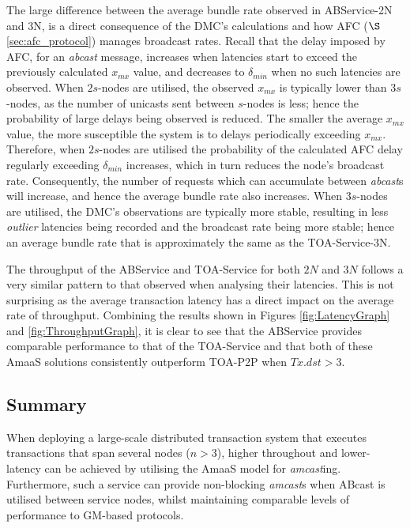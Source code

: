     The large difference between the average bundle rate observed in ABService-2N and 3N, is a direct consequence of the DMC's calculations and how AFC ($\S$ \ref{sec:afc_protocol}) manages broadcast rates.  Recall that the delay imposed by AFC, for an \emph{abcast} message, increases when latencies start to exceed the previously calculated $x_{mx}$ value, and decreases to $\delta_{min}$ when no such latencies are observed.  When $2 s$-nodes are utilised, the observed $x_{mx}$ is typically lower than $3 s$-nodes, as the number of unicasts sent between $s$-nodes is less; hence the probability of large delays being observed is reduced.  The smaller the average $x_{mx}$ value, the more susceptible the system is to delays periodically exceeding $x_{mx}$.  Therefore, when $2 s$-nodes are utilised the probability of the calculated AFC delay regularly exceeding $\delta_{min}$ increases, which in turn reduces the node's broadcast rate.  Consequently, the number of requests which can accumulate between \emph{abcast}s will increase, and hence the average bundle rate also increases.  When $3 s$-nodes are utilised, the DMC's observations are typically more stable, resulting in less \emph{outlier} latencies being recorded and the broadcast rate being more stable; hence an average bundle rate that is approximately the same as the TOA-Service-3N.  
	
	The throughput of the ABService and TOA-Service for both $2N$ and $3N$ follows a very similar pattern to that observed when analysing their latencies.  This is not surprising as the average transaction latency has a direct impact on the average rate of throughput.  Combining the results shown in Figures \ref{fig:LatencyGraph} and \ref{fig:ThroughputGraph}, it is clear to see that the ABService provides comparable performance to that of the TOA-Service and that both of these \textsf{AmaaS} solutions consistently outperform TOA-P2P when $Tx.dst > 3$.  
	
	\subsection{Summary}
	When deploying a large-scale distributed transaction system that executes transactions that span several nodes ($n > 3$), higher throughout and lower-latency can be achieved by utilising the \textsf{AmaaS} model for \emph{amcast}ing.  Furthermore, such a service can provide non-blocking \emph{amcast}s when \textsf{ABcast} is utilised between service nodes, whilst maintaining comparable levels of performance to GM-based protocols.  

